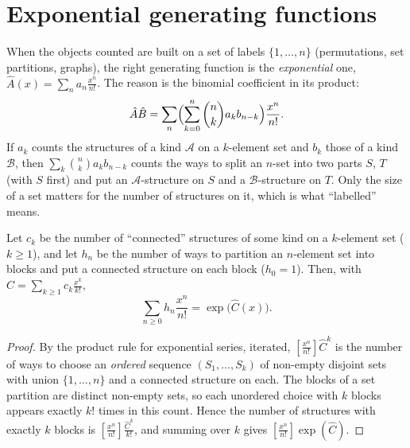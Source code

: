 \section{Exponential generating functions}

When the objects counted are built on a set of labels $\{1,\dots,n\}$ (permutations, set partitions, graphs), the right
generating function is the \emph{exponential} one, $\hat A(x)=\sum_na_n\frac{x^n}{n!}$. The reason is the binomial
coefficient in its product:
\[
\hat A\hat B=\sum_n\Bigl(\sum_{k=0}^n\binom nka_kb_{n-k}\Bigr)\frac{x^n}{n!}.
\]
If $a_k$ counts the structures of a kind $\mathcal A$ on a $k$-element set and $b_k$ those of a kind $\mathcal B$, then
$\sum_k\binom nka_kb_{n-k}$ counts the ways to split an $n$-set into two parts $S$, $T$ (with $S$ first) and put an
$\mathcal A$-structure on $S$ and a $\mathcal B$-structure on $T$. Only the size of a set matters for the number of
structures on it, which is what ``labelled'' means.

\begin{theorem}\label{thm:expformula}
Let $c_k$ be the number of ``connected'' structures of some kind on a $k$-element set ($k\ge1$), and let $h_n$ be the
number of ways to partition an $n$-element set into blocks and put a connected structure on each block ($h_0=1$).
Then, with $\hat C=\sum_{k\ge1}c_k\frac{x^k}{k!}$,
\[
\sum_{n\ge0}h_n\frac{x^n}{n!}=\exp\bigl(\hat C(x)\bigr).
\]
\end{theorem}
\begin{proof}
By the product rule for exponential series, iterated, $[\frac{x^n}{n!}]\hat C^k$ is the number of ways to choose an
\emph{ordered} sequence $(S_1,\dots,S_k)$ of non-empty disjoint sets with union $\{1,\dots,n\}$ and a connected
structure on each. The blocks of a set partition are distinct non-empty sets, so each unordered choice with $k$
blocks appears exactly $k!$ times in this count. Hence the number of structures with exactly $k$ blocks is
$[\frac{x^n}{n!}]\frac{\hat C^k}{k!}$, and summing over $k$ gives $[\frac{x^n}{n!}]\exp(\hat C)$.
\end{proof}

